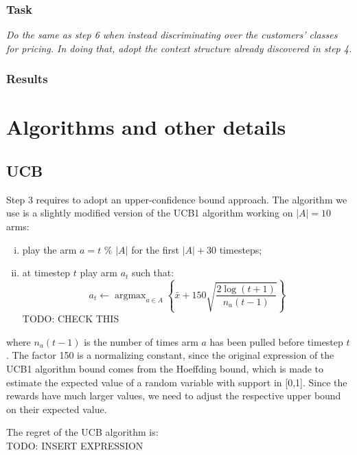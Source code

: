 \documentclass[12pt,a4paper]{report}
\DeclareMathOperator*{\argmax}{argmax}
\begin{document}
			\subsection{Task}
\textit{Do the same as step 6 when instead discriminating over the customers’ classes for pricing. In doing that, adopt the context structure already discovered in step 4.}
			\subsection{Results}

	\chapter{Algorithms and other details}
		\section{UCB}
Step 3 requires to adopt an upper-confidence bound approach. The algorithm we use is a slightly modified version of the UCB1 algorithm working on $|A|=10$ arms:
\begin{enumerate}[i)]
	\item play the arm $a=t$  $\%$  $|A|$ for the first $|A|+30$ timesteps;
	\item at timestep $t$ play arm $a_t$ such that:
		$$a_t \leftarrow \argmax_{a \in A} \left\{\bar x + 150 \sqrt{\frac{2 \log(t+1)}{n_a(t-1)}}\right\} $$
TODO: CHECK THIS
\end{enumerate}
where $n_a(t-1)$ is the number of times arm $a$ has been pulled before timestep $t$. The factor 150 is a normalizing constant, since the original expression of the UCB1 algorithm bound comes from the Hoeffding bound, which is made to estimate the expected value of a random variable with support in [0,1]. Since the rewards have much larger values, we need to adjust the respective upper bound on their expected value.

The regret of the UCB algorithm is: \\TODO: INSERT EXPRESSION
\end{document}
